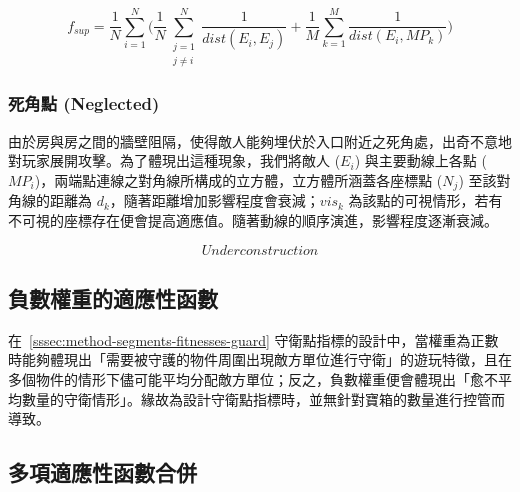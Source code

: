 \begin{equation}
f_{sup}=\frac{1}{N} \sum_{i=1}^{N} \bigg( \frac{1}{N} \sum_{\substack{j=1 \\ j \neq i}}^{N} \frac{1}{dist(E_{i}, E_{j})} + \frac{1}{M} \sum_{k=1}^{M} \frac{1}{dist(E_{i}, MP_{k})} \bigg)
\end{equation}

\subsubsection{死角點 (Neglected)}
\label{sssec:method-segments-fitnesses-neglected}

由於房與房之間的牆壁阻隔，使得敵人能夠埋伏於入口附近之死角處，出奇不意地對玩家展開攻擊。為了體現出這種現象，我們將敵人 ($E_{i}$) 與主要動線上各點 ($MP_{i}$)，兩端點連線之對角線所構成的立方體，立方體所涵蓋各座標點 ($N_{j}$) 至該對角線的距離為 $d_{k}$，隨著距離增加影響程度會衰減；$vis_{k}$ 為該點的可視情形，若有不可視的座標存在便會提高適應值。隨著動線的順序演進，影響程度逐漸衰減。

\begin{equation}
Under construction
\end{equation}



\subsection{負數權重的適應性函數}
\label{ssec:method-segments-minusscores}

在~\ref{sssec:method-segments-fitnesses-guard} 守衛點指標的設計中，當權重為正數時能夠體現出「需要被守護的物件周圍出現敵方單位進行守衛」的遊玩特徵，且在多個物件的情形下儘可能平均分配敵方單位；反之，負數權重便會體現出「愈不平均數量的守衛情形」。緣故為設計守衛點指標時，並無針對寶箱的數量進行控管而導致。

\subsection{多項適應性函數合併}
\label{ssec:method-segments-multiobjectives}

